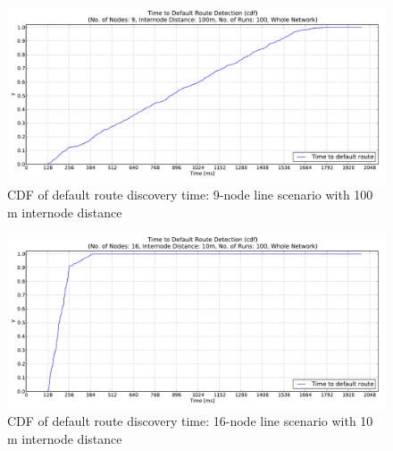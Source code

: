 \begin{figure}[htpb]
  \begin{center}
    \leavevmode
      \includegraphics[scale=0.38]
      {Pics/results/9/MRHOF/line/dist100_montecarlo_cdf_hist.pdf}
   \caption{CDF of default route discovery time: 9-node line scenario with 100 m internode distance}
   \label{fig:9_MRHOF_line100_cdf}
  \end{center}
\end{figure}


\begin{figure}[htpb]
  \begin{center}
    \leavevmode
      \includegraphics[scale=0.38]
      {Pics/results/16/MRHOF/line/dist10_montecarlo_cdf_hist.pdf}
   \caption{CDF of default route discovery time: 16-node line scenario with 10 m internode distance}
   \label{fig:16_MRHOF_line_10_cdf}
  \end{center}
\end{figure}

